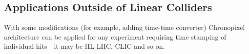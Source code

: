 \subsection{Applications Outside of Linear Colliders}
     With some modifications (for example, adding time-time converter) Chronopixel architecture can be applied for any experiment requiring time stamping of individual hits - it may be HL-LHC, CLIC and so on.
